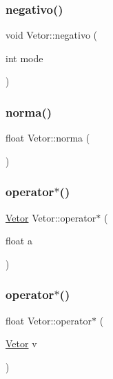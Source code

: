 \mbox{\label{class_vetor_a1374cc636a82d6f038219fd29891133e}} 
\subsubsection{\texorpdfstring{negativo()}{negativo()}\hspace{0.1cm}{\footnotesize\ttfamily [2/2]}}
{\footnotesize\ttfamily void Vetor\+::negativo (\begin{DoxyParamCaption}\item[{int}]{mode }\end{DoxyParamCaption})}

\mbox{\label{class_vetor_a26e8c7db35c90a9313cfcb780a1ab324}} 
\subsubsection{\texorpdfstring{norma()}{norma()}}
{\footnotesize\ttfamily float Vetor\+::norma (\begin{DoxyParamCaption}{ }\end{DoxyParamCaption})}

\mbox{\label{class_vetor_a02b8c1a9f2d9d9701e553e4d31a3b841}} 
\subsubsection{\texorpdfstring{operator$\ast$()}{operator*()}\hspace{0.1cm}{\footnotesize\ttfamily [1/2]}}
{\footnotesize\ttfamily \hyperlink{class_vetor}{Vetor} Vetor\+::operator$\ast$ (\begin{DoxyParamCaption}\item[{float}]{a }\end{DoxyParamCaption})}

\mbox{\label{class_vetor_ae632976a4d2f4e0479999f20a085843e}} 
\subsubsection{\texorpdfstring{operator$\ast$()}{operator*()}\hspace{0.1cm}{\footnotesize\ttfamily [2/2]}}
{\footnotesize\ttfamily float Vetor\+::operator$\ast$ (\begin{DoxyParamCaption}\item[{\hyperlink{class_vetor}{Vetor}}]{v }\end{DoxyParamCaption})}

